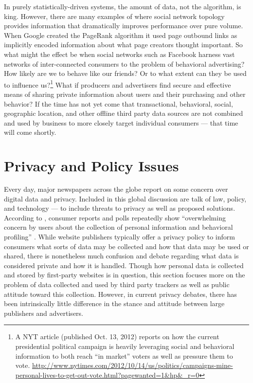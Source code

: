In purely statistically-driven systems, the amount of data, not the algorithm, is king. However, there are many examples of where social network topology provides information that dramatically improves performance over pure volume. When Google created the PageRank algorithm it used page outbound links as implicitly encoded information about what page creators thought important. So what might the effect be when social networks such as Facebook harness vast networks of inter-connected consumers to the problem of behavioral advertising? How likely are we to behave like our friends? Or to what extent can they be used to influence us?\footnote{A NYT article (published Oct. 13, 2012) reports on how the current presidential political campaign is heavily leveraging social and behavioral information to both reach ``in market'' voters as well as pressure them to vote.  \url{http://www.nytimes.com/2012/10/14/us/politics/campaigns-mine-personal-lives-to-get-out-vote.html?pagewanted=1&hp&_r=0} } What if producers and advertisers find secure and effective means of sharing private information about users and their purchasing and other behavior? If the time has not yet come that transactional, behavioral, social, geographic location, and other offline third party data sources are not combined and used by business to more closely target individual consumers --- that time will come shortly.

\section{Privacy and Policy Issues}
\label{privacyandpolicyissues}

Every day, major newspapers across the globe report on some concern over digital data and privacy. Included in this global discussion are talk of law, policy, and technology --- to include threats to privacy as well as proposed solutions. According to  \cite*{Gomez:2009ue},  consumer reports and polls repeatedly show ``overwhelming concern by users about the collection of personal information and behavioral profiling''  \citep[p. 17]{Gomez:2009ue}.  While website publishers typically offer a privacy policy to inform consumers what sorts of data may be collected and how that data may be used or shared, there is nonetheless much confusion and debate regarding what data is considered private and how it is handled. Though how personal data is collected and stored by first-party websites is in question, this section focuses more on the problem of data collected and used by third party trackers as well as public attitude toward this collection. However, in current privacy debates, there has been intrinsically little difference in the stance and attitude between large publishers and advertisers.

